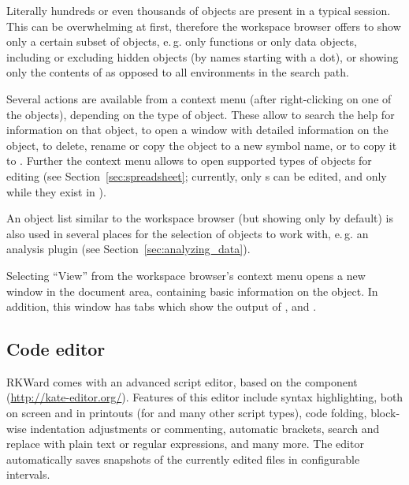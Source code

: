 Literally hundreds or even thousands of objects are present in a typical
 session. This can be overwhelming at
first, therefore the workspace browser offers to show only a certain
subset of objects, e.\,g. only functions or only data objects, including
or excluding hidden objects (by names starting with a 
dot), or showing only the contents of  as
opposed to all environments in the search path.

Several actions are available from a context menu (after right-clicking
on one of the objects), depending on the type of object. These allow to search the
 help for information on that object, to
open a window with detailed information on the object, to delete, rename or copy the object to a new symbol name, or to
copy it to . Further the context menu allows to open
supported types of objects for editing (see Section~\ref{sec:spreadsheet}; currently, only
s can be edited, and only while they exist in ).

An object list similar to the workspace browser (but showing only
 by default) is also used in several places for the
selection of objects to work with, e.\,g. an analysis plugin (see Section~\ref{sec:analyzing_data}).

Selecting ``View'' from the workspace
browser's context menu opens a new window in the
document area, containing basic information on the object. In
addition, this window has tabs which show the output of
, and .

\subsection{Code editor}
\label{sec:code_editor}

RKWard comes with an advanced
 script editor, based on the
 component
(\url{http://kate-editor.org/}). Features of this
editor include syntax highlighting, both on screen and in printouts (for
 and many other script types), code
folding, block-wise indentation adjustments or commenting, automatic
brackets, search and replace with plain text or regular expressions,
and many more. The editor automatically saves snapshots of the
currently edited files in configurable intervals.

